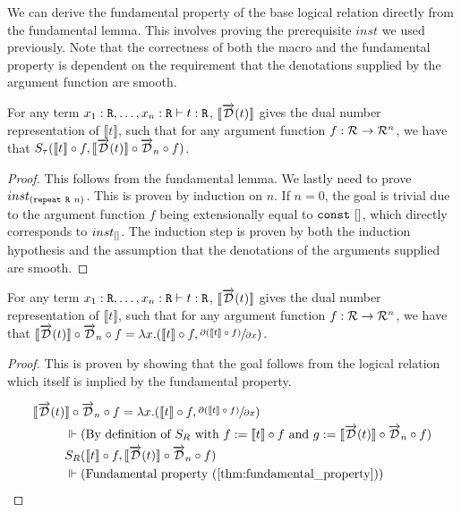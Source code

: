   We can derive the fundamental property of the base logical relation directly from the fundamental lemma.
  This involves proving the prerequisite $inst$ we used previously.
  Note that the correctness of both the macro and the fundamental property is dependent on the requirement that the denotations supplied by the argument function are smooth.

  \begin{corollary}\label{thm:fundamental_property}
    For any term $x_1 : \texttt{R}, \dots, x_n : \texttt{R} \vdash t : \texttt{R}$, $\llbracket\overrightarrow{\mathcal{D}}(t)\rrbracket$ gives the dual number representation of $\llbracket t \rrbracket$, such that for any argument function $f : \mathcal{R} \to \mathcal{R}^n$, we have that $S_\tau(\llbracket t\rrbracket \circ f, \llbracket \overrightarrow{\mathcal{D}}(t)\rrbracket \circ \overrightarrow{\mathcal{D}}_n \circ f)$.
  \end{corollary}

  \begin{proof}
    This follows from the fundamental lemma. We lastly need to prove $inst_{(\texttt{repeat}\ \texttt{R}\ n)}$.
    This is proven by induction on $n$.
    If $n = 0$, the goal is trivial due to the argument function $f$ being extensionally equal to $\texttt{const}\ []$, which directly corresponds to $inst_{[]}$.
    The induction step is proven by both the induction hypothesis and the assumption that the denotations of the arguments supplied are smooth.
  \end{proof}

  \begin{theorem}\label{thm:macro_correctness}
    For any term $x_1 : \texttt{R}, \dots, x_n : \texttt{R} \vdash t : \texttt{R}$, $\llbracket\overrightarrow{\mathcal{D}}(t)\rrbracket$ gives the dual number representation of $\llbracket t \rrbracket$, such that for any argument function $f : \mathcal{R} \rightarrow \mathcal{R}^n$, we have that $\llbracket \overrightarrow{\mathcal{D}}(t) \rrbracket \circ \overrightarrow{\mathcal{D}}_n \circ f = \lambda x. (\llbracket t \rrbracket \circ f, \sfrac{\partial{(\llbracket t \rrbracket \circ f)}}{\partial{x}})$.
  \end{theorem}

  \begin{proof}
    This is proven by showing that the goal follows from the logical relation which itself is implied by the fundamental property.

    \begin{align*}
      \llbracket \D(t) &\rrbracket \circ \D_n \circ f = \lambda x. (\llbracket t \rrbracket \circ f, \sfrac{\partial{(\llbracket t \rrbracket \circ f)}}{\partial{x}}) \\
      & \Vdash \text{(By definition of $S_R$ with $f := \llbracket t \rrbracket \circ f$ and $g := \llbracket \D(t) \rrbracket \circ \D_n \circ f$)} \\
      & S_R(\llbracket t \rrbracket \circ f, \llbracket \D(t) \rrbracket \circ \D_n \circ f) \\
      & \Vdash \text{(Fundamental property (\cref{thm:fundamental_property}))}
    \end{align*}
  \end{proof}
